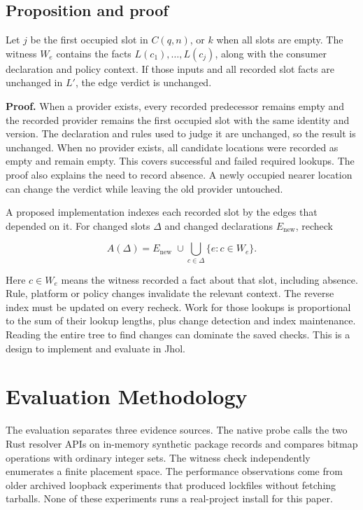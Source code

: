 \documentclass[
  11pt,
  letterpaper,
]{article}
\begin{document}
\subsection{Proposition and proof}\label{proposition-and-proof}

Let \(j\) be the first occupied slot in \(C(q,n)\), or \(k\) when all
slots are empty. The witness \(W_e\) contains the facts
\(L(c_1),\ldots,L(c_j)\), along with the consumer declaration and policy
context. If those inputs and all recorded slot facts are unchanged in
\(L'\), the edge verdict is unchanged.

\textbf{Proof.} When a provider exists, every recorded predecessor
remains empty and the recorded provider remains the first occupied slot
with the same identity and version. The declaration and rules used to
judge it are unchanged, so the result is unchanged. When no provider
exists, all candidate locations were recorded as empty and remain empty.
This covers successful and failed required lookups. The proof also
explains the need to record absence. A newly occupied nearer location
can change the verdict while leaving the old provider untouched.

A proposed implementation indexes each recorded slot by the edges that
depended on it. For changed slots \(\Delta\) and changed declarations
\(E_{\mathrm{new}}\), recheck

\[A(\Delta)=E_{\mathrm{new}}\;\cup\!
\bigcup_{c\in\Delta}\{e:c\in W_e\}.\]

Here \(c\in W_e\) means the witness recorded a fact about that slot,
including absence. Rule, platform or policy changes invalidate the
relevant context. The reverse index must be updated on every recheck.
Work for those lookups is proportional to the sum of their lookup
lengths, plus change detection and index maintenance. Reading the entire
tree to find changes can dominate the saved checks. This is a design to
implement and evaluate in Jhol.

\section{Evaluation Methodology}\label{evaluation-methodology}

The evaluation separates three evidence sources. The native probe calls
the two Rust resolver APIs on in-memory synthetic package records and
compares bitmap operations with ordinary integer sets. The witness check
independently enumerates a finite placement space. The performance
observations come from older archived loopback experiments that produced
lockfiles without fetching tarballs. None of these experiments runs a
real-project install for this paper.
\end{document}
